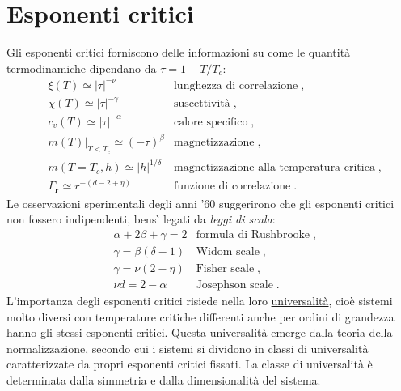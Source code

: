 \documentclass[10pt,a4paper]{report}
\theoremstyle{definition}
\numberwithin{equation}{section}
\begin{document}
\section{Esponenti critici}
Gli esponenti critici forniscono delle informazioni su come le quantità termodinamiche dipendano da $\tau=1-T/T_c$:
\begin{align*}
&\xi(T)\simeq |\tau|^{-\nu} & \mbox{lunghezza di correlazione}\;, \\
&\chi(T)\simeq |\tau|^{-\gamma} & \mbox{suscettività}\;, \\
&c_v(T)\simeq |\tau|^{-\alpha} &\mbox{calore specifico}\;, \\
&m(T)|_{T<T_c}\simeq (-\tau)^{\beta} & \mbox{magnetizzazione}\;, \\
&m(T=T_c,h)\simeq |h|^{1/\delta} & \mbox{magnetizzazione alla temperatura critica}\;, \\
&\Gamma_{\mathbf{r}}\simeq r^{-(d-2+\eta)} &\mbox{funzione di correlazione}\;.
\end{align*}
Le osservazioni sperimentali degli anni '60 suggerirono che gli esponenti critici non fossero indipendenti, bensì legati da \emph{leggi di scala}:
\begin{align}
&\alpha+2\beta+\gamma=2 &\mbox{formula di Rushbrooke}\;, \label{ch5_rushbrooke} \\
&\gamma=\beta(\delta-1) &\mbox{Widom scale}\;, \label{ch5_widom}\\
&\gamma=\nu(2-\eta) &\mbox{Fisher scale}\;, \label{ch5_fisher} \\
&\nu d=2-\alpha &\mbox{Josephson scale}\;. \label{josephson}
\end{align}
L'importanza degli esponenti critici risiede nella loro \underline{universalità}, cioè sistemi molto diversi con temperature critiche differenti anche per ordini di grandezza hanno gli stessi esponenti critici. Questa universalità emerge dalla teoria della normalizzazione, secondo cui i sistemi si dividono in classi di universalità caratterizzate da propri esponenti critici fissati. La classe di universalità è determinata dalla simmetria e dalla dimensionalità del sistema.
\end{document}
